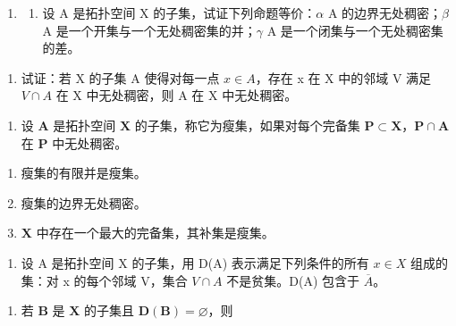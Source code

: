 \ExerciseSection

\begin{enumerate}
\def\labelenumi{\arabic{enumi})}
\tightlist
\item
  \begin{enumerate}
  \def\labelenumii{\alph{enumii})}
  \tightlist
  \item
    设 A 是拓扑空间 X 的子集，试证下列命题等价：\(\alpha\) A 的边界无处稠密；\(\beta\) A 是一个开集与一个无处稠密集的并；\(\gamma\) A 是一个闭集与一个无处稠密集的差。
  \end{enumerate}
\end{enumerate}

\begin{enumerate}
\def\labelenumi{\alph{enumi})}
\setcounter{enumi}{1}
\tightlist
\item
  试证：若 X 的子集 A 使得对每一点 \(x \in A\)，存在 x 在 X 中的邻域 V 满足 \(V \cap A\) 在 X 中无处稠密，则 A 在 X 中无处稠密。
\end{enumerate}

\begin{enumerate}
\def\labelenumi{\arabic{enumi})}
\setcounter{enumi}{1}
\tightlist
\item
  设 \(\mathbf{A}\) 是拓扑空间 \(\mathbf{X}\) 的子集，称它为瘦集，如果对每个完备集 \(\mathbf{P} \subset \mathbf{X}\)，\(\mathbf{P} \cap \mathbf{A}\) 在 \(\mathbf{P}\) 中无处稠密。
\end{enumerate}

\begin{enumerate}
\def\labelenumi{\alph{enumi})}
\item
  瘦集的有限并是瘦集。
\item
  瘦集的边界无处稠密。
\item
  \(\mathbf{X}\) 中存在一个最大的完备集，其补集是瘦集。
\end{enumerate}

\begin{enumerate}
\def\labelenumi{\arabic{enumi})}
\setcounter{enumi}{2}
\tightlist
\item
  设 A 是拓扑空间 X 的子集，用 D(A) 表示满足下列条件的所有 \(x \in X\) 组成的集：对 x 的每个邻域 V，集合 \(V \cap A\) 不是贫集。D(A) 包含于 \(\overline{A}\)。
\end{enumerate}

\begin{enumerate}
\def\labelenumi{\alph{enumi})}
\tightlist
\item
  若 \(\mathbf{B}\) 是 \(\mathbf{X}\) 的子集且 \(\mathbf{D}(\mathbf{B}) = \varnothing\)，则
\end{enumerate}

